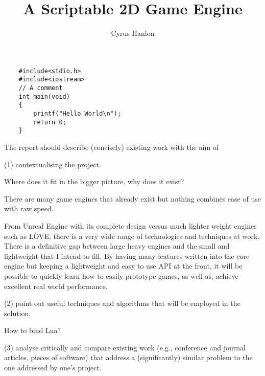 \documentclass[11pt,a4paper,titlepage]{article}
\author{Cyrus Hanlon}
\title{A Scriptable 2D Game Engine}
\begin{document}
	\maketitle
	

	\begin{lstlisting}
	#include<stdio.h>
	#include<iostream>
	// A comment
	int main(void)
	{
		printf("Hello World\n");
		return 0;
	}
	\end{lstlisting}
	
	The report should describe (concisely) existing work with the aim of 
	
	(1) contextualising the project.
		
		Where does it fit in the bigger picture, why does it exist?

		There are many game engines that already exist but nothing combines ease of use with raw speed.
		
		From Unreal Engine with its complete design versus much lighter weight engines such as LÖVE, there is a very wide range of technologies and techniques at work. There is a definitive gap between large heavy engines and the small and lightweight that I intend to fill. By having many features written into the core engine but keeping a lightweight and easy to use API at the front, it will be possible to quickly learn how to easily prototype games, as well as, achieve excellent real world performance.
	
	(2) point out useful techniques and algorithms that will be employed in the solution. 
		
		How to bind Lua?
		
	(3) analyse critically and compare existing work (e.g., conference and journal articles, pieces of software) that address a (significantly) similar	problem to the one addressed by one’s project.
	
\end{document}
